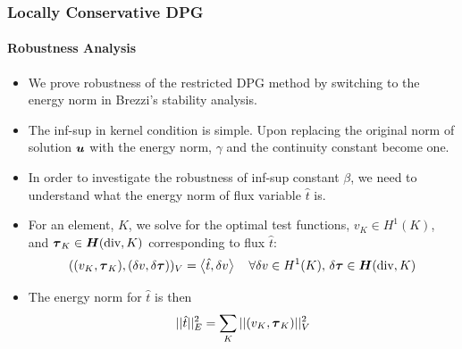 \documentclass[18pt,xcolor=table]{beamer}
\begin{document}
%                                                                                                      
%                                                                                                      
%  
\begin{frame}[noframenumbering]
\frametitle{Locally Conservative DPG}
\framesubtitle{Robustness Analysis}
\begin{itemize}
  \item We prove robustness of the restricted DPG method by switching to the
    energy norm in Brezzi's stability analysis.
  \item The inf-sup in kernel condition is simple. Upon replacing the original
    norm of solution $\boldsymbol u$ with the energy norm, $\gamma$ and the continuity
    constant become one.
  \item In order to investigate the robustness of inf-sup constant $\beta$, we
    need to understand what the energy norm of flux variable $\hat t$ is.
  \item For an element, $K$, we solve for the optimal test functions,
    $v_K\in H^1(K)$, and $\boldsymbol\tau_K\in\mbox{\boldmath $H$}(\text{div},K)$
    corresponding to flux $\hat t$:
    \[
    ( (v_K,\boldsymbol\tau_K),(\delta v,\delta\boldsymbol\tau) )_V=\left\langle \hat t,\delta v \right\rangle
    \quad\forall\delta v\in H^1(K),\,\delta\boldsymbol\tau\in\mbox{\boldmath $H$}(\text{div},K)
    \]
  \item The energy norm for $\hat t$ is then
    \[
    ||\hat t||_E^2=\sum_K||(v_K,\boldsymbol\tau_K)||_V^2
    \]
\end{itemize}
\end{frame}

\end{document}
